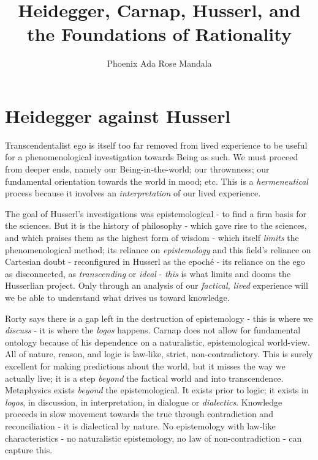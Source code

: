 \documentclass[]{turabian-researchpaper}
\title{Heidegger, Carnap, Husserl, and the Foundations of Rationality}
\author{Phoenix Ada Rose Mandala}
\begin{document}
	\maketitle

	\section{Heidegger against Husserl}

	Transcendentalist ego is itself too far removed from lived experience to be useful
	for a phenomenological investigation towards Being as such. We must proceed
	from deeper ends, namely our Being-in-the-world; our thrownness; our fundamental
	orientation towards the world in mood; etc. This is a \emph{hermeneutical}
	process because it involves an \emph{interpretation} of our lived experience.

	The goal of Husserl's investigations was epistemological - to find a firm basis
	for the sciences. But it is the history of philosophy - which gave rise to the
	sciences, and which praises them as the highest form of wisdom - which itself \emph{limits}
	the phenomenological method; its reliance on \emph{epistemology} and this
	field's reliance on Cartesian doubt - reconfigured in Husserl as the epoch\'e
	- its reliance on the ego as disconnected, as \emph{transcending} or \emph{ideal}
	- \emph{this} is what limits and dooms the Husserlian project. Only through an
	analysis of our \emph{factical, lived} experience will we be able to
	understand what drives us toward knowledge.

	Rorty says there is a gap left in the destruction of epistemology - this is
	where we \emph{discuss} - it is where the \textit{logos} happens. Carnap does not
	allow for fundamental ontology because of his dependence on a naturalistic,
	epistemological world-view. All of nature, reason, and logic is law-like,
	strict, non-contradictory. This is surely excellent for making predictions
	about the world, but it misses the way we actually live; it is a step \emph{beyond}
	the factical world and into transcendence. Metaphysics exists \emph{beyond} the
	epistemological. It exists prior to logic; it exists in \textit{logos}, in discussion,
	in interpretation, in dialogue or \emph{dialectics}. Knowledge proceeds in slow
	movement towards the true through contradiction and reconciliation - it is dialectical
	by nature. No epistemology with law-like characteristics - no naturalistic
	epistemology, no law of non-contradiction - can capture this.
\end{document}
